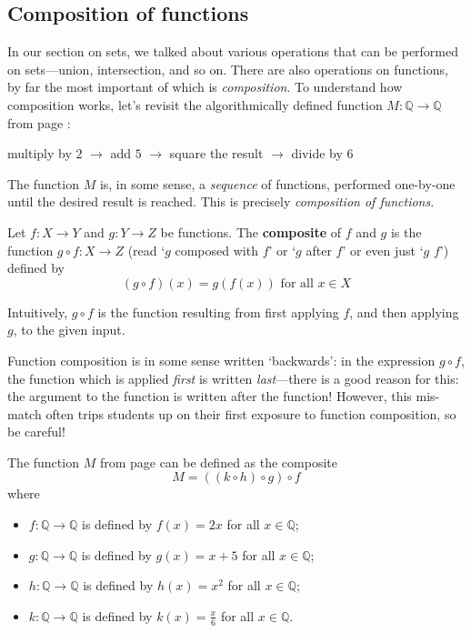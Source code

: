 \subsection*{Composition of functions}

In our section on sets, we talked about various operations that can be performed on sets---union, intersection, and so on. There are also operations on functions, by far the most important of which is \textit{composition}. To understand how composition works, let's revisit the algorithmically defined function $M : \mathbb{Q} \to \mathbb{Q}$ from page \pageref{txtAlgorithmicallyDefinedFunctionExample}:
\begin{center}
multiply by $2$ $\to$ add $5$ $\to$ square the result $\to$ divide by $6$
\end{center}
The function $M$ is, in some sense, a \textit{sequence} of functions, performed one-by-one until the desired result is reached. This is precisely \textit{composition of functions}.

\begin{definition}
\label{defComposition}
\label{defComposite}
Let $f : X \to Y$ and $g : Y \to Z$ be functions. The \textbf{composite} of $f$ and $g$ is the function $g \circ f : X \to Z$%
  (read `$g$ composed with $f$' or `$g$ after $f$' or even just `$g$ $f$') defined by
\[ (g \circ f)(x) = g(f(x)) \text{ for all } x \in X \]
\end{definition}
Intuitively, $g \circ f$ is the function resulting from first applying $f$, and then applying $g$, to the given input.

\begin{commonerror}
Function composition is in some sense written `backwards': in the expression $g \circ f$, the function which is applied \textit{first} is written \textit{last}---there is a good reason for this: the argument to the function is written after the function! However, this mis-match often trips students up on their first exposure to function composition, so be careful!
\end{commonerror}

\begin{example}
\label{exDecompositionOfFunctionQToQ}
The function $M$ from page \pageref{txtAlgorithmicallyDefinedFunctionExample} can be defined as the composite
\[ M = ((k \circ h) \circ g) \circ f \]
where
\begin{itemize}
\item $f : \mathbb{Q} \to \mathbb{Q}$ is defined by $f(x)=2x$ for all $x \in \mathbb{Q}$;
\item $g : \mathbb{Q} \to \mathbb{Q}$ is defined by $g(x)=x+5$ for all $x \in \mathbb{Q}$;
\item $h : \mathbb{Q} \to \mathbb{Q}$ is defined by $h(x)=x^2$ for all $x \in \mathbb{Q}$;
\item $k : \mathbb{Q} \to \mathbb{Q}$ is defined by $k(x)=\frac{x}{6}$ for all $x \in \mathbb{Q}$.
\end{itemize}
\end{example}

